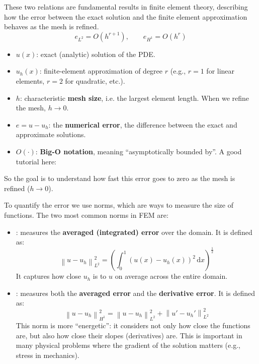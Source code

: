 \highspace
\begin{deepeningbox}[: $e_{L^2} = O\left(h^{r+1}\right)$ and $e_{H^1} = O\left(h^r\right)$]
    These two relations are fundamental results in finite element theory, describing how the error between the exact solution and the finite element approximation behaves as the mesh is refined.
    \begin{equation*}
        e_{L^2} = O\left(h^{r+1}\right), \qquad e_{H^1} = O\left(h^{r}\right)
    \end{equation*}
    \begin{itemize}
        \item $u(x)$: exact (analytic) solution of the PDE.
        \item $u_{h}(x)$: finite-element approximation of degree $r$ (e.g., $r=1$ for linear elements, $r=2$ for quadratic, etc.).
        \item $h$: characteristic \textbf{mesh size}, i.e. the largest element length. When we refine the mesh, $h \to 0$.
        \item $e = u - u_{h}$: the \textbf{numerical error}, the difference between the exact and approximate solutions.
        \item $O(\cdot)$: \textbf{Big-O notation}, meaning ``asymptotically bounded by''. A good tutorial here:
        \begin{center}
        \end{center}
    \end{itemize}
    So the goal is to understand how fast this error goes to zero as the mesh is refined ($h \to 0$).

    \highspace
    To quantify the error we use norms, which are ways to measure the size of functions. The two most common norms in FEM are:
    \begin{itemize}
        \item {}: measures the \textbf{averaged (integrated) error} over the domain. It is defined as:
        \begin{equation*}
            \left\|u - u_{h}\right\|_{L^{2}}^{2} = \left(
                \displaystyle\int_{0}^{1} \left(u(x) - u_{h}(x)\right)^{2} \, \mathrm{d}x
            \right)^{\frac{1}{2}}
        \end{equation*}
        It captures how close $u_{h}$ is to $u$ on average across the entire domain.

        \item {}: measures both the \textbf{averaged error} and the \textbf{derivative error}. It is defined as:
        \begin{equation*}
            \left\|u - u_{h}\right\|_{H^{1}}^{2} =
            \left\|u - u_{h}\right\|_{L^{2}}^{2} + \left\|u' - u_{h}'\right\|_{L^{2}}^{2}
        \end{equation*}
        This norm is more ``energetic'': it considers not only how close the functions are, but also how close their slopes (derivatives) are. This is important in many physical problems where the gradient of the solution matters (e.g., stress in mechanics).
    \end{itemize}
\end{deepeningbox}